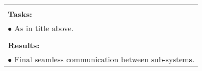 \begin{table}[!h]
\begin{center}
\begin{tabular}{|p{}||p{}|p{}||p{}|}
            \multicolumn{4}{|p{.95\columnwidth}|}{}\\
            \multicolumn{4}{|p{.95\columnwidth}|}{\textbf{Tasks:}}\\
            \multicolumn{4}{|p{.95\columnwidth}|}{$\bullet$ As in title above.}\\
            \multicolumn{4}{|p{.95\columnwidth}|}{}\\
            \multicolumn{4}{|p{.95\columnwidth}|}{\textbf{Results:}}\\
            \multicolumn{4}{|p{.95\columnwidth}|}{$\bullet$ Final seamless communication between sub-systems. }\\
            \hline
        \end{tabular}
    \end{center}
\end{table}

\clearpage


